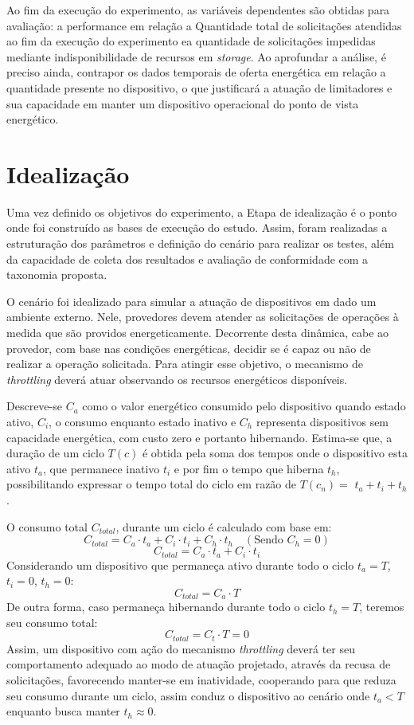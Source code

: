 Ao fim da execução do experimento, as variáveis dependentes são obtidas para avaliação: a performance em relação a Quantidade total de solicitações atendidas ao fim da execução do experimento ea quantidade de solicitações impedidas mediante indisponibilidade de recursos em \textit{storage}. Ao aprofundar a análise, é preciso ainda, contrapor os dados temporais de oferta energética em relação a quantidade presente no dispositivo, o que justificará a atuação de limitadores e sua capacidade em manter um dispositivo operacional do ponto de vista energético.


\section{Idealização}
\label{cap6:idealizacao}
Uma vez definido os objetivos do experimento, a Etapa de idealização é o ponto onde foi construído as bases de execução do estudo. Assim, foram realizadas a estruturação  dos parâmetros e definição do cenário para realizar os testes, além da capacidade de coleta dos resultados e avaliação de conformidade com a taxonomia proposta.

O cenário foi idealizado para simular a atuação de dispositivos em dado um ambiente externo. Nele, provedores devem atender as solicitações de operações à medida que são providos energeticamente. Decorrente desta dinâmica, cabe ao provedor, com base nas condições energéticas, decidir se é capaz ou não de realizar a operação solicitada. Para atingir esse objetivo, o mecanismo de \textit{throttling} deverá atuar observando os recursos energéticos disponíveis.

Descreve-se \( C_a \) como o valor energético consumido pelo dispositivo quando estado ativo, \( C_i \), o consumo enquanto estado inativo e \( C_h \) representa dispositivos sem capacidade energética, com custo zero e portanto hibernando. Estima-se que, a duração de um ciclo $T(c)$ é obtida pela soma dos tempos onde o dispositivo esta ativo \( t_a \), que permanece inativo \( t_i \) e por fim o tempo que hiberna \( t_h \), possibilitando expressar o tempo total do ciclo em razão de $T(c_n) = $ \( t_a + t_i + t_h \).

O consumo total $C_{total}$, durante um ciclo é calculado com base em:
\[C_{total} = C_a \cdot t_a + C_i \cdot t_i + C_h \cdot t_h \quad (\text{Sendo }C_h = 0)\]
\[C_{total} = C_a \cdot t_a + C_i \cdot t_i\]
Considerando um dispositivo que permaneça ativo durante todo o ciclo \( t_a = T \), \( t_i = 0 \), \( t_h = 0 \):
\[ C_{total} = C_a \cdot T \]
De outra forma, caso permaneça hibernando durante todo o ciclo \( t_h = T \), teremos seu consumo total:
\[ C_{total} = C_t \cdot T = 0 \]
Assim, um dispositivo com ação do mecanismo \textit{throttling} deverá ter seu comportamento adequado ao modo de atuação projetado, através da recusa de solicitações, favorecendo manter-se em inatividade, cooperando para que reduza seu consumo durante um ciclo, assim conduz o dispositivo ao cenário onde \( t_a < T \) enquanto busca manter $t_h \approx 0$.

